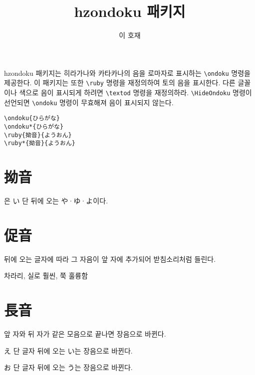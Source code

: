 \documentclass[b5paper]{article}
\title{hzondoku 패키지}
\author{이 호재}
\date{}
\begin{document}
\maketitle

hzondoku 패키지는 히라가나와 카타카나의 음을 로마자로 표시하는 \verb|\ondoku| 명령을 제공한다.
이 패키지는 또한 \verb|\ruby| 명령을 재정의하여 토의 음을 표시한다.
다른 글꼴이나 색으로 음이 표시되게 하려면 \verb|\textod| 명령을 재정의하라.
\verb|\HideOndoku| 명령이 선언되면 \verb|\ondoku| 명령이 무효해져 음이 표시되지 않는다.

\begin{verbatim}
\ondoku{ひらがな}
\ondoku*{ひらがな}
\ruby{拗音}{ようおん}
\ruby*{拗音}{ようおん}
\end{verbatim}


\twocolumn

\section{拗音}

은 い 단 뒤에 오는 や·ゆ·よ이다.


\section{促音}

 뒤에 오는 글자에 따라 그 자음이 앞 자에 추가되어 받침소리처럼 들린다.


 차라리, 실로  
 훨씬, 쭉 
 훌륭함 

\section{長音}


앞 자와 뒤 자가 같은 모음으로 끝나면 장음으로 바뀐다.

 

え 단 글자 뒤에 오는 い는 장음으로 바뀐다.


お 단 글자 뒤에 오는 う는 장음으로 바뀐다.
\end{document}

